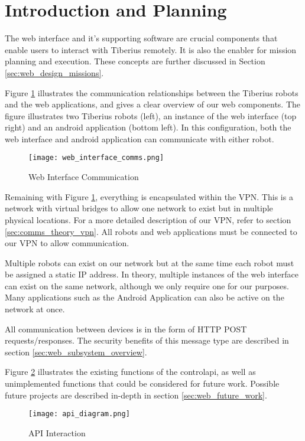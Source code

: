 \section{Introduction and Planning}

The web interface and it's supporting software are crucial components that enable users to interact with Tiberius remotely. It is also the enabler for mission planning and execution. These concepts are further discussed in Section  \ref{sec:web_design_missions}.

Figure \ref{fig:web-interface-communication} illustrates the communication relationships between the Tiberius robots and the web applications, and gives a clear overview of our web components. The figure illustrates two Tiberius robots (left), an instance of the web interface (top right) and an android application (bottom left). In this configuration, both the web interface and android application can communicate with either robot.

\begin{figure}[!htb]
\begin{center}
\texttt{[image: web\_interface\_comms.png]}
\end{center}
\caption{Web Interface Communication}
\label{fig:web-interface-communication}
\end{figure}


Remaining with Figure \ref{fig:web-interface-communication}, everything is encapsulated within the \gls{VPN}. This is a network with virtual bridges to allow one network to exist but in multiple physical locations. For a more detailed description of our \gls{VPN}, refer to section \ref{sec:comms_theory_vpn}. All robots and web applications must be connected to our \gls{VPN} to allow communication.

Multiple robots can exist on our network but at the same time each robot must be assigned a static IP address. In theory, multiple instances of the web interface can exist on the same network, although we only require one for our purposes. Many applications such as the Android Application can also be active on the network at once.

All communication between devices is in the form of \gls{HTTP} \gls{POST} requests/responses. The security benefits of this message type are described in section \ref{sec:web_subsystem_overview}.

Figure \ref{fig:api-interaction} illustrates the existing functions of the \gls{controlapi}, as well as unimplemented functions that could be considered for future work. Possible future projects are described in-depth in section \ref{sec:web_future_work}.
\begin{figure}[!htb]
\begin{center}
\texttt{[image: api\_diagram.png]}
\end{center}
\caption{API Interaction}
\label{fig:api-interaction}
\end{figure}

